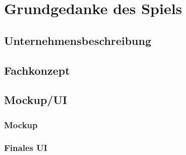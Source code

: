 \clearpage
\chapter{Grundgedanke des Spiels}
\section{Unternehmensbeschreibung}
\section{Fachkonzept}
\section{Mockup/UI}
\subsection{Mockup}
\subsection{Finales UI}